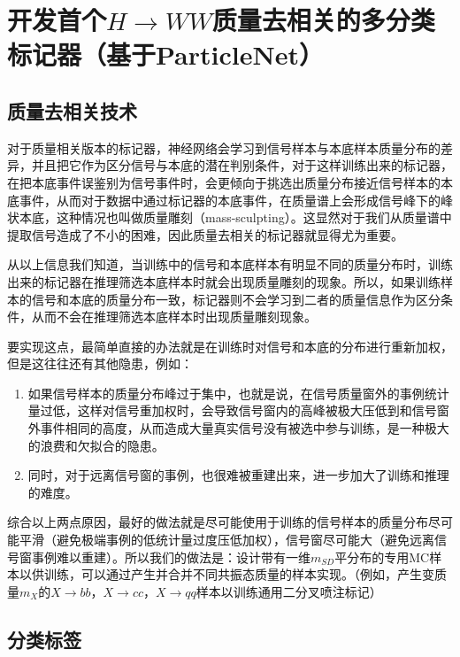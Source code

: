 \chapter{开发首个$H\to WW$质量去相关的多分类标记器（基于ParticleNet）}
\label{chap5}
\fontsize{12bp}{14.4pt}

\section{质量去相关技术}
对于质量相关版本的标记器，神经网络会学习到信号样本与本底样本质量分布的差异，并且把它作为区分信号与本底的潜在判别条件，对于这样训练出来的标记器，在把本底事件误鉴别为信号事件时，会更倾向于挑选出质量分布接近信号样本的本底事件，从而对于数据中通过标记器的本底事件，在质量谱上会形成信号峰下的峰状本底，这种情况也叫做质量雕刻（mass-sculpting）。这显然对于我们从质量谱中提取信号造成了不小的困难，因此质量去相关的标记器就显得尤为重要。

从以上信息我们知道，当训练中的信号和本底样本有明显不同的质量分布时，训练出来的标记器在推理筛选本底样本时就会出现质量雕刻的现象。所以，如果训练样本的信号和本底的质量分布一致，标记器则不会学习到二者的质量信息作为区分条件，从而不会在推理筛选本底样本时出现质量雕刻现象。

要实现这点，最简单直接的办法就是在训练时对信号和本底的分布进行重新加权，但是这往往还有其他隐患，例如：
\begin{enumerate}[(1)]
    \item 如果信号样本的质量分布峰过于集中，也就是说，在信号质量窗外的事例统计量过低，这样对信号重加权时，会导致信号窗内的高峰被极大压低到和信号窗外事件相同的高度，从而造成大量真实信号没有被选中参与训练，是一种极大的浪费和欠拟合的隐患。
    \item 同时，对于远离信号窗的事例，也很难被重建出来，进一步加大了训练和推理的难度。
\end{enumerate}
综合以上两点原因，最好的做法就是尽可能使用于训练的信号样本的质量分布尽可能平滑（避免极端事例的低统计量过度压低加权），信号窗尽可能大（避免远离信号窗事例难以重建）。所以我们的做法是：设计带有一维$ m_{SD}$平分布的专用MC样本以供训练，可以通过产生并合并不同共振态质量的样本实现。（例如，产生变质量$m_X$的$X\to bb$，$X\to cc$，$X\to qq$样本以训练通用二分叉喷注标记）

\section{分类标签}
